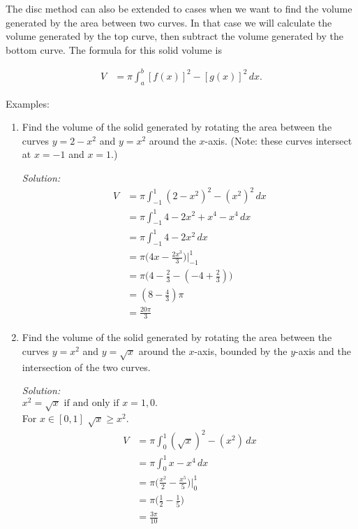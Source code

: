 \documentclass[16pt]{article}
\theoremstyle{remark}
\begin{document}
The disc method can also be extended to cases when we want to find the volume generated by the area between two curves. In that case we will calculate the volume generated by the top curve, then subtract the volume generated by the bottom curve. The formula for this solid volume is

\begin{align*}
V &= \pi \int_a^b  {[ f(x) ]}^2  - {[ g(x) ]}^2 \, dx.
\end{align*}

Examples:
\begin{enumerate}
\item Find the volume of the solid generated by rotating the area between the curves $y=2-x^2$ and $y=x^2$ around the $x$-axis. (Note: these curves intersect at $x=-1$ and $x=1$.)
\begin{mdframed}[style=TheoremFrame]
\textit{Solution:}
\begin{align*}
V &= \pi \int_{-1}^1 (2-x^2)^2 - (x^2)^2 \, dx\\
&= \pi \int_{-1}^1 4-2x^2+x^4 - x^4 \, dx\\
&= \pi \int_{-1}^1 4-2x^2 \, dx\\
&= \pi \big(4x-\frac{2x^3}{3}\big) \bigg|_{-1}^1\\
&= \pi \big(4-\frac{2}{3} - (-4+\frac{2}{3})\big)\\
&= (8-\frac{4}{3})\pi\\
&= \frac{20\pi}{3}
\end{align*}
\end{mdframed}

\item Find the volume of the solid generated by rotating the area between the curves $y=x^2$ and $y=\sqrt{x}$ around the $x$-axis, bounded by the $y$-axis and the intersection of the two curves. 
\begin{mdframed}[style=TheoremFrame]
\textit{Solution:}\\

$x^2 = \sqrt{x} \text{ if and only if } x=1,0.$\\
For $x \in {[0,1]}$ $\sqrt{x} \geq x^2$.
\begin{align*}
V&= \pi \int_0^1 (\sqrt{x})^2 - (x^2) \, dx\\
&= \pi \int_0^1 x - x^4 \, dx\\
&= \pi \bigg(\frac{x^2}{2} - \frac{x^5}{5} \bigg) \bigg|_0^1\\
&= \pi \bigg(\frac{1}{2} - \frac{1}{5}\bigg)\\
&= \frac{3\pi}{10}
\end{align*}
\end{mdframed}
\end{enumerate}
\end{document}
